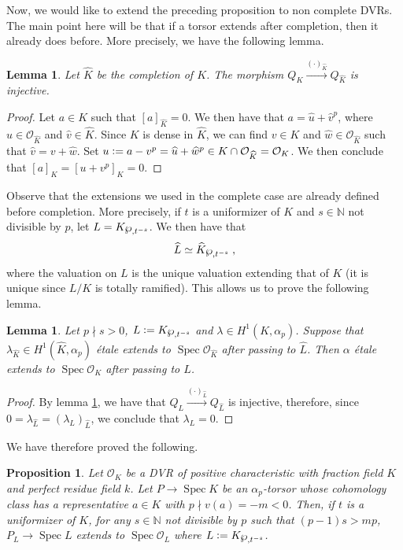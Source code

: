 \documentclass[a4paper,english,12pt]{amsart}
\newtheorem{proposition}[definition]{Proposition}
\newtheorem{lemma}[definition]{Lemma}
\numberwithin{equation}{section}
\newcommand{\defeq}{\vcentcolon=}
\DeclareMathOperator{\Spec}{Spec}
\renewcommand{\wp}{\ensuremath\raisebox{\depth}{$\mathchar"17D$}}
\renewcommand{\_}{\rule{0.25cm}{0.4pt}}
\begin{document}
Now, we would like to extend the preceding proposition to non complete DVRs. The main point here will be that if a torsor extends after completion, then it already does before. More precisely, we have the following lemma.

\begin{lemma}\label{injectivity after completion}
    Let $\widehat{K}$ be the completion of $K$. The morphism $Q_{K}\xrightarrow{(\cdot)_{\widehat{K}}} Q_{\widehat{K}}$ is injective.
\end{lemma}
\begin{proof}
    Let $a\in K$ such that $[a]_{\widehat{K}}=0$. We then have that $a=\widehat{u}+\widehat{v}^{p}$, where $\widehat{u}\in\mathcal{O}_{\widehat{K}}$ and $\widehat{v}\in\widehat{K}$.
    Since $K$ is dense in $\widehat{K}$, we can find $v\in K$ and $\widehat{w}\in \mathcal{O}_{\widehat{K}}$ such that $\widehat{v}=v+\widehat{w}$. Set $u\defeq a-v^{p}=\widehat{u}+\widehat{w}^{p}\in K\cap\mathcal{O}_{\widehat{K}}=\mathcal{O}_{K}$. We then conclude that $[a]_{K}=[u+v^{p}]_{K}=0$.
\end{proof}

Observe that the extensions we used in the complete case are already defined before completion. More precisely, if $t$ is a uniformizer of $K$ and $s\in\mathbb{N}$ not divisible by $p$, let $L=K_{\wp, t^{-s}}$. We then have that
\[
    \widehat{L}\simeq \widehat{K}_{\wp, t^{-s}}\;,
\]
where the valuation on $L$ is the unique valuation extending that of $K$ (it is unique since $L/K$ is totally ramified). This allows us to prove the following lemma.

\begin{lemma}
    Let $p\nmid s>0$, $L\defeq K_{\wp, t^{-s}}$ and $\lambda\in H^{1}(K,\alpha_{p})$. Suppose that $\lambda_{\widehat{K}}\in H^{1}(\widehat{K},\alpha_{p})$ étale extends to $\Spec \mathcal{O}_{\widehat{K}}$ after passing to $\widehat{L}$. Then $\alpha$ étale extends to $\Spec \mathcal{O}_{K}$ after passing to $L$.
\end{lemma}
\begin{proof}
    By lemma \ref{injectivity after completion}, we have that $Q_{L}\xrightarrow{(\cdot)_{\widehat{L}}} Q_{\widehat{L}}$ is injective, therefore, since $0=\lambda_{\widehat{L}}=(\lambda_{L})_{\widehat{L}}$, we conclude that $\lambda_{L}=0$.
\end{proof}

We have therefore proved the following.

\begin{proposition}\label{alpha_{p} dvr}
    Let $\mathcal{O}_{K}$ be a DVR of positive characteristic with fraction field $K$ and perfect residue field $k$. Let $P\to \Spec K$ be an $\alpha_{p}$-torsor whose cohomology class has a representative $a\in K$ with $p\nmid v(a)=-m<0$. Then, if $t$ is a uniformizer of $K$, for any $s\in\mathbb{N}$ not divisible by $p$ such that $(p-1)s>mp$, $P_{L}\to\Spec L$ extends to $\Spec \mathcal{O}_{L}$ where $L\defeq K_{\wp, t^{-s}}$.
\end{proposition}
\end{document}
